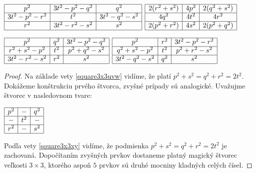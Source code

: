 \begin{center}
$\begin{array}{ |c|c|c| } 
\hline
p^2 & 3t^2 - p^2 - q^2 & q^2 \\ 
\hline
3t^2 - p^2 - r^2 & t^2 & 3t^2 - q^2 - s^2 \\ 
\hline
r^2 & 3t^2 - r^2 - s^2 & s^2 \\
\hline
\end{array}$
{}
$\begin{array}{ |c|c|c| } 
\hline
2(r^2 + s^2) & 4p^2 & 2(q^2 + s^2) \\ 
\hline
4q^2 & 4t^2 & 4r^2 \\ 
\hline
2(p^2 + r^2) & 4s^2 & 2(p^2 + q^2) \\
\hline
\end{array}$
\end{center}
\begin{center}
$\begin{array}{ |c|c|c| } 
\hline
p^2 & q^2 & 3t^2 - p^2 - q^2 \\ 
\hline
r^2 + s^2 - p^2 & t^2 & p^2 + q^2 - s^2 \\ 
\hline
3t^2 - r^2 - s^2 & r^2 & s^2 \\
\hline
\end{array}$
{}
$\begin{array}{ |c|c|c| } 
\hline
p^2 & r^2 & 3t^2 - p^2 - r^2 \\ 
\hline
q^2 + s^2 - p^2 & t^2 & p^2 + r^2 - s^2 \\ 
\hline
3t^2 - q^2 - s^2 & q^2 & s^2 \\
\hline
\end{array}$
\end{center}

\begin{proof}
Na základe vety \ref{square3x3uvw} vidíme, že platí $p^2 + s^2 = q^2 + r^2 = 2t^2$. Dokážeme konštrukciu prvého štvorca, zvyšné prípady sú analogické. Uvažujme štvorec v nasledovnom tvare:

\begin{center}
$\begin{array}{ |c|c|c| } 
\hline
p^2 & - & q^2 \\ 
\hline
- & t^2 & - \\ 
\hline
r^2 & - & s^2 \\
\hline
\end{array}$
\end{center}

Podľa vety \ref{square3x3xy} vidíme, že podmienka $p^2 + s^2 = q^2 + r^2 = 2t^2$ je zachovaná. Dopočítaním zvyšných prvkov dostaneme platný magický štvorec veľkosti $3 \times 3$, ktorého aspoň $5$ prvkov sú druhé mocniny kladných celých čísel.
\end{proof}


